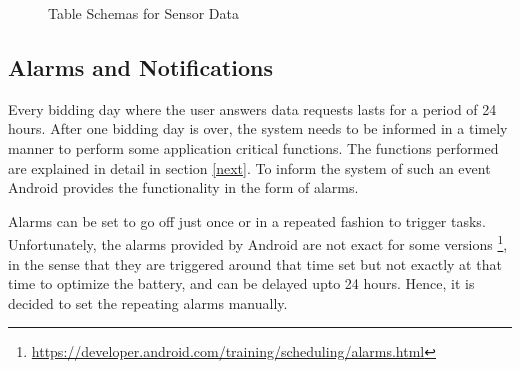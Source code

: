 \begin{figure}[htp]
\hspace{1em}
%
\caption{Table Schemas for Sensor Data}
\label{fig:ts22}
\end{figure}

\subsection{Alarms and Notifications}

Every bidding day where the user answers data requests lasts for a period of 24 hours. After one bidding day is over, the system needs to be informed in a timely manner to perform some application critical functions. The functions performed are explained in detail in section \ref{next}. 
To inform the system of such an event Android provides the functionality in the form of alarms. 

Alarms can be set to go off just once or in a repeated fashion to trigger tasks. Unfortunately, the alarms provided by Android are not exact for some versions \footnote{\url{https://developer.android.com/training/scheduling/alarms.html}}, in the sense that they are triggered around that time set but not exactly at that time to optimize the battery, and can be delayed upto 24 hours. Hence, it is decided to set the repeating alarms manually. 

